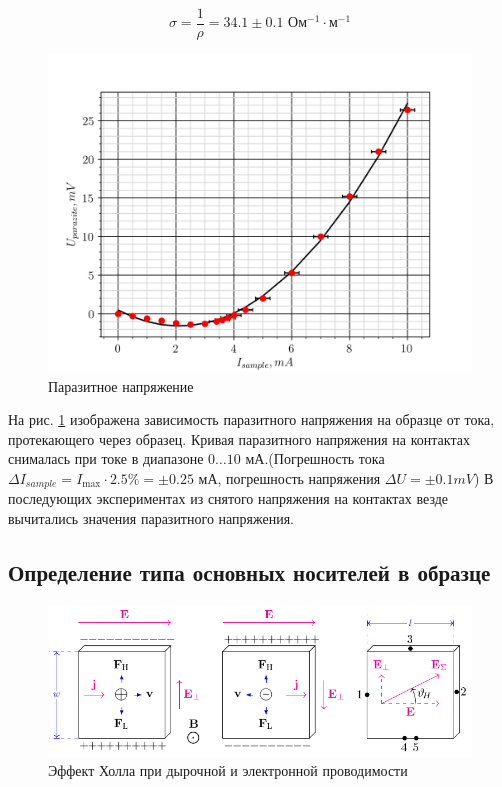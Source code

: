 \begin{equation}
	\sigma=\frac{1}{\rho}=34.1\pm0.1 \text{ Ом$^{-1}\cdot$м$^{-1}$}
\end{equation}

\begin{figure}[h!]
	\centering
		\includegraphics[width = .8\linewidth]{graphs/paraz.png}
		\caption{Паразитное напряжение}
		\label{fig:5.3}
\end{figure}
	
На рис. \ref{fig:5.3} изображена зависимость паразитного напряжения на образце от тока, протекающего через образец.
Кривая паразитного напряжения на контактах снималась при токе в диапазоне $0\ldots10$ мА.(Погрешность тока $\Delta
I_{sample} = I_{\max}\cdot 2.5\% = \pm 0.25 \text{ мА}$, погрешность напряжения $\Delta U = \pm 0.1 mV$)
В последующих экспериментах из снятого напряжения на контактах везде вычитались значения паразитного напряжения.

\subsection{Определение типа основных носителей в образце}

\begin{figure}[h!]
	\centering
	\includegraphics[width=\linewidth]{fig/effect.pdf}
	\caption{Эффект Холла при дырочной и электронной проводимости}
	\label{fig:hall}
\end{figure}


